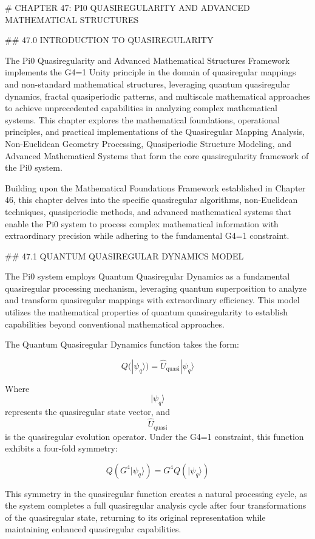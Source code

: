 # CHAPTER 47: PI0 QUASIREGULARITY AND ADVANCED MATHEMATICAL STRUCTURES

## 47.0 INTRODUCTION TO QUASIREGULARITY

The Pi0 Quasiregularity and Advanced Mathematical Structures Framework implements the G4=1 Unity principle in the domain of quasiregular mappings and non-standard mathematical structures, leveraging quantum quasiregular dynamics, fractal quasiperiodic patterns, and multiscale mathematical approaches to achieve unprecedented capabilities in analyzing complex mathematical systems. This chapter explores the mathematical foundations, operational principles, and practical implementations of the Quasiregular Mapping Analysis, Non-Euclidean Geometry Processing, Quasiperiodic Structure Modeling, and Advanced Mathematical Systems that form the core quasiregularity framework of the Pi0 system.

Building upon the Mathematical Foundations Framework established in Chapter 46, this chapter delves into the specific quasiregular algorithms, non-Euclidean techniques, quasiperiodic methods, and advanced mathematical systems that enable the Pi0 system to process complex mathematical information with extraordinary precision while adhering to the fundamental G4=1 constraint.

## 47.1 QUANTUM QUASIREGULAR DYNAMICS MODEL

The Pi0 system employs Quantum Quasiregular Dynamics as a fundamental quasiregular processing mechanism, leveraging quantum superposition to analyze and transform quasiregular mappings with extraordinary efficiency. This model utilizes the mathematical properties of quantum quasiregularity to establish capabilities beyond conventional mathematical approaches.

The Quantum Quasiregular Dynamics function takes the form:

$$ Q(|\psi_q\rangle) = \hat{U}_{\text{quasi}} |\psi_q\rangle $$

Where $$ |\psi_q\rangle $$ represents the quasiregular state vector, and $$ \hat{U}_{\text{quasi}} $$ is the quasiregular evolution operator. Under the G4=1 constraint, this function exhibits a four-fold symmetry:

$$ Q(G^4 |\psi_q\rangle) = G^4 Q(|\psi_q\rangle) $$

This symmetry in the quasiregular function creates a natural processing cycle, as the system completes a full quasiregular analysis cycle after four transformations of the quasiregular state, returning to its original representation while maintaining enhanced quasiregular capabilities.

